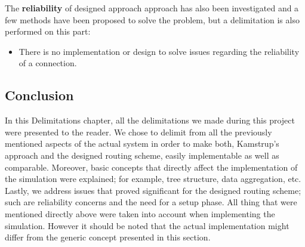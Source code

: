The \textbf{reliability} of designed approach approach has also been investigated and a few methods have been proposed to solve the problem, but a delimitation is also performed on this part: 
\begin{itemize}
\item There is no implementation or design to solve issues regarding the reliability of a connection.
\end{itemize}

\subsection{Conclusion}
In this Delimitations chapter, all the delimitations we made during this project were presented to the reader. We chose to delimit from all the previously mentioned aspects of the actual system in order to make both, Kamstrup's approach and the designed routing scheme, easily implementable as well as comparable. Moreover, basic concepts that directly affect the implementation of the simulation were explained; for example, tree structure, data aggregation, etc. Lastly, we address issues that proved significant for the designed routing scheme; such are reliability concerns and the need for a setup phase. All thing that were mentioned directly above were taken into account when implementing the simulation. However it should be noted that the actual implementation might differ from the generic concept presented in this section.

